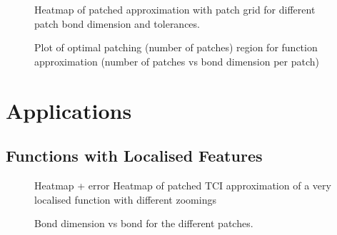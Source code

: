 \begin{figure}[ht!]
	\caption{Heatmap of patched approximation with patch grid for different patch bond dimension and tolerances.}
\end{figure}

\begin{figure}[ht!]
	\caption{Plot of optimal patching (number of patches) region for function approximation (number of patches vs bond dimension per patch)}
\end{figure}



\section{Applications}

\subsection{Functions with Localised Features}

\begin{figure}[ht!]
	\caption{Heatmap + error Heatmap of patched TCI approximation of a very localised function with different zoomings  }
\end{figure}

\begin{figure}[ht!]
	\caption{Bond dimension vs bond for the different patches. }
\end{figure}




